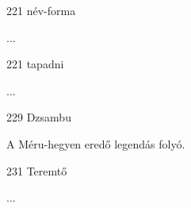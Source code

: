 
\begin{notesdescription}

\item[{221}
{név-forma}
{}] \hfill\par

...

\item[{221}
{tapadni}
{}] \hfill\par

...

\item[{229}
{Dzsambu}
{}]

A Méru-hegyen eredő legendás folyó.

\item[{231}
{Teremtő}
{}] \hfill\par

...

\end{notesdescription}

